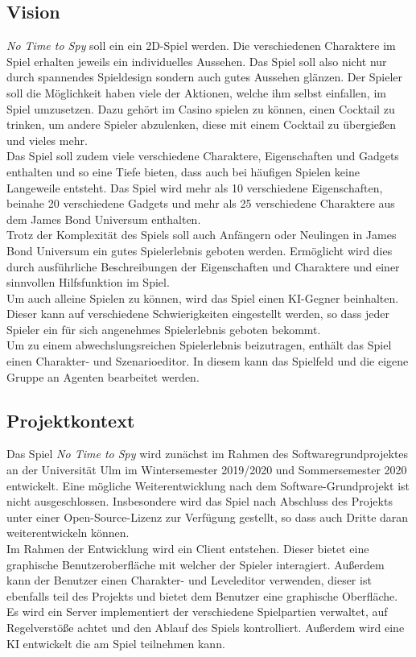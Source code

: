 \subsection{Vision}
\textit{No Time to Spy} soll ein ein 2D-Spiel werden. Die verschiedenen Charaktere im Spiel erhalten jeweils ein individuelles Aussehen. Das Spiel soll also nicht nur durch spannendes Spieldesign sondern auch gutes Aussehen glänzen. Der Spieler soll die Möglichkeit haben viele der Aktionen, welche ihm selbst einfallen, im Spiel umzusetzen. Dazu gehört im Casino spielen zu können, einen Cocktail zu trinken, um andere Spieler abzulenken, diese mit einem Cocktail zu übergießen und vieles mehr.\\
Das Spiel soll zudem viele verschiedene Charaktere, Eigenschaften und Gadgets enthalten und so eine Tiefe bieten, dass auch bei häufigen Spielen keine Langeweile entsteht. Das Spiel wird mehr als 10 verschiedene Eigenschaften, beinahe 20 verschiedene Gadgets und mehr als 25 verschiedene Charaktere aus dem James Bond Universum enthalten. \\
Trotz der Komplexität des Spiels soll auch Anfängern oder Neulingen in James Bond Universum ein gutes Spielerlebnis geboten werden. Ermöglicht wird dies durch ausführliche Beschreibungen der Eigenschaften und Charaktere und einer sinnvollen Hilfsfunktion im Spiel.\\
Um auch alleine Spielen zu können, wird das Spiel einen KI-Gegner beinhalten. Dieser kann auf verschiedene Schwierigkeiten eingestellt werden, so dass jeder Spieler ein für sich angenehmes Spielerlebnis geboten bekommt.\\
Um zu einem abwechslungsreichen Spielerlebnis beizutragen, enthält das Spiel einen Charakter- und Szenarioeditor. In diesem kann das Spielfeld und die eigene Gruppe an Agenten bearbeitet werden. 

\clearpage
\subsection{Projektkontext}
Das Spiel \textit{No Time to Spy} wird zunächst im Rahmen des Softwaregrundprojektes an der Universität Ulm im Wintersemester 2019/2020 und Sommersemester 2020 entwickelt.
Eine mögliche Weiterentwicklung nach dem Software-Grundprojekt ist nicht ausgeschlossen. Insbesondere wird das Spiel nach Abschluss des Projekts unter einer Open-Source-Lizenz zur Verfügung gestellt, so dass auch Dritte daran weiterentwickeln können.\\

Im Rahmen der Entwicklung wird ein Client entstehen. Dieser bietet eine graphische Benutzeroberfläche mit welcher der Spieler interagiert. Außerdem kann der Benutzer einen Charakter- und Leveleditor verwenden, dieser ist ebenfalls teil des Projekts und bietet dem Benutzer eine graphische Oberfläche.\\
Es wird ein Server implementiert der verschiedene Spielpartien verwaltet, auf Regelverstöße achtet und den Ablauf des Spiels kontrolliert. Außerdem wird eine KI entwickelt die am Spiel teilnehmen kann.
